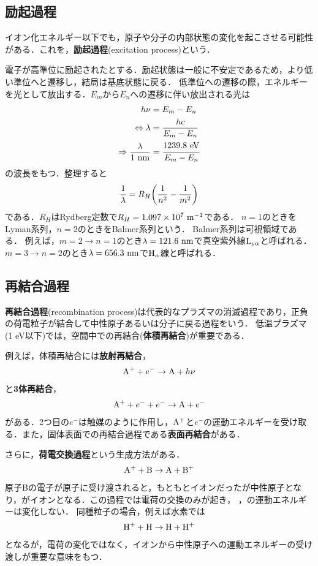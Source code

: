 \documentclass{report}
\begin{document}
    \subsection{励起過程}
      イオン化エネルギー以下でも，原子や分子の内部状態の変化を起こさせる可能性がある．これを，\textbf{励起過程}(excitation process)という．
      \par
      電子が高準位に励起されたとする．励起状態は一般に不安定であるため，より低い準位へと遷移し，結局は基底状態に戻る．
      低準位への遷移の際，エネルギーを光として放出する．$E_m$から$E_n$への遷移に伴い放出される光は
      \begin{align}
        h\nu &= E_m - E_n\\
        \Leftrightarrow \lambda &= \frac{hc}{E_m - E_n} \\ 
        \Rightarrow \frac{\lambda}{1\ \r{nm}} &= \cfrac{1239.8\ \r{eV}}{E_m - E_n}
      \end{align}
      の波長をもつ．整理すると
      \begin{align}
        \frac{1}{\lambda} = R_H \qty(\frac{1}{n^2} - \frac{1}{m^2})
      \end{align}
      である．$R_H$はRydberg定数で$R_H = 1.097 \times 10^7\ \mathrm{m^{-1}}$である．
      $n = 1$のときをLyman系列，$n = 2$のときをBalmer系列という．
      Balmer系列は可視領域である．
      例えば，$m = 2 \to n = 1$のとき$\lambda = 121.6\ \mathrm{nm}$で真空紫外線$\mathrm{L}_{\mathrm{y}\alpha}$と呼ばれる．
      $m = 3 \to n = 2$のとき$\lambda = 656.3\ \mathrm{nm}$で$\mathrm{H}_{\alpha}$線と呼ばれる．
    \subsection{再結合過程}
      \textbf{再結合過程}(recombination process)は代表的なプラズマの消滅過程であり，正負の荷電粒子が結合して中性原子あるいは分子に戻る過程をいう．
      低温プラズマ(1 eV以下)では，空間中での再結合(\textbf{体積再結合})が重要である．
      \par
      例えば，体積再結合には\textbf{放射再結合}，
      \begin{align}
        \ce{A}^+ + e^- \rightarrow \ce{A} + h\nu
      \end{align}
      と\textbf{3体再結合}，
      \begin{align}
        \ce{A}^+ + e^- + e^- \rightarrow \ce{A} + e^-
      \end{align}
      がある．2つ目の$e^-$は触媒のように作用し，$\ce{A}^+$と$e^-$の運動エネルギーを受け取る．また，固体表面での再結合過程である\textbf{表面再結合}がある．
      \par
      さらに，\textbf{荷電交換過程}という生成方法がある．
      \begin{align}
        \ce{A}^+ + \ce{B} \rightarrow \ce{A} + \ce{B}^+
      \end{align}
      原子Bの電子が原子に受け渡されると，もともとイオンだったが中性原子となり，がイオンとなる．この過程では電荷の交換のみが起き，
      ，の運動エネルギーは変化しない．
      同種粒子の場合，例えば水素では
      \begin{align}
        \ce{H}^+ + \ce{H} \rightarrow \ce{H} + \ce{H}^+
      \end{align}
      となるが，電荷の変化ではなく，イオンから中性原子への運動エネルギーの受け渡しが重要な意味をもつ．
\end{document}
